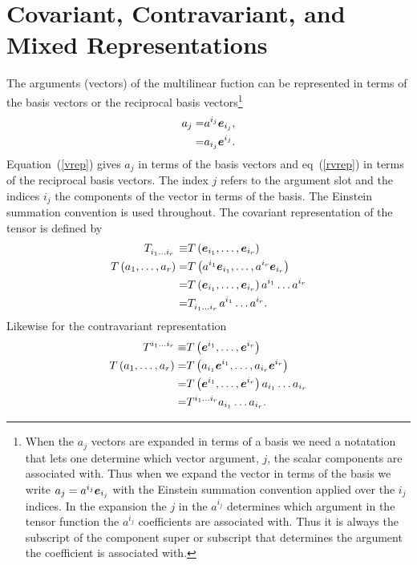 \section{Covariant, Contravariant, and Mixed Representations}

The arguments (vectors) of the multilinear fuction can be represented in terms of the basis vectors or the reciprocal basis vectors\footnote{When the $a_{j}$ vectors are expanded in terms of a basis we need a notatation that lets one determine which vector argument, $j$, the scalar components are associated with.  Thus when we expand the vector in terms of the basis we write
$a_{j} = a^{i_{j}}\bm{e}_{i_{j}}$ with the Einstein summation convention applied over the $i_{j}$ indices. In the expansion the
$j$ in the $a^{i_{j}}$ determines which argument in the tensor function the $a^{i_{j}}$ coefficients are associated with.  Thus
it is always the subscript of the component super or subscript that determines the argument the coefficient is associated with.}
\begin{align}
	a_{j} =& a^{i_{j}}\bm{e}_{i_{j}}, \label{vrep}\\
	      =& a_{i_{j}}\bm{e}^{i_{j}}. \label{rvrep}
\end{align}
Equation~(\ref{vrep}) gives $a_{j}$ in terms of the basis vectors and eq~(\ref{rvrep}) in terms of the reciprocal basis vectors. The index
$j$ refers to the argument slot and the indices $i_{j}$ the components of the vector in terms of the basis.  The Einstein summation
convention is used throughout.  The covariant representation of the tensor is defined by
\begin{align}
	T\indices{_{i_{1}\dots i_{r}}} \equiv& \f{T}{\eb_{i_{1}},\dots,\eb_{i_{r}}} \\
	\f{T}{a_{1},\dots,a_{r}} =& \f{T}{a^{i_{1}}\eb_{i_{1}},\dots,a^{i_{r}}\eb_{i_{r}}} \nonumber \\
	                         =& \f{T}{\eb_{i_{1}},\dots,\eb_{i_{r}}}a^{i_{1}}\dots a^{i_{r}} \nonumber \\
	                         =& T\indices{_{i_{1}\dots i_{r}}}a^{i_{1}}\dots a^{i_{r}}.
\end{align}
Likewise for the contravariant representation
\begin{align}
	T\indices{^{i_{1}\dots i_{r}}} \equiv& \f{T}{\eb^{i_{1}},\dots,\eb^{i_{r}}} \\
	\f{T}{a_{1},\dots,a_{r}} =& \f{T}{a_{i_{1}}\eb^{i_{1}},\dots,a_{i_{r}}\eb^{i_{r}}} \nonumber \\
	                         =& \f{T}{\eb^{i_{1}},\dots,\eb^{i_{r}}}a_{i_{1}}\dots a_{i_{r}} \nonumber \\
	                         =& T\indices{^{i_{1}\dots i_{r}}}a_{i_{1}}\dots a_{i_{r}}.
\end{align}
